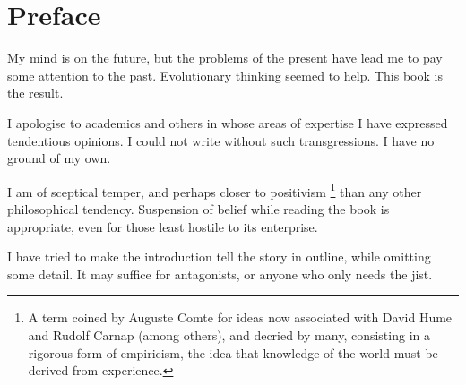 \chapter*{Preface}


My mind is on the future, but the problems of the present have lead me to pay some attention to the past.
Evolutionary thinking seemed to help.
This book is the result.

I apologise to academics and others in whose areas of expertise I have expressed tendentious opinions.
I could not write without such transgressions.
I have no ground of my own.

I am of sceptical temper, and perhaps closer to positivism%
\footnote{A term coined by Auguste Comte for ideas now associated with David Hume and Rudolf Carnap (among others), and decried by many, consisting in a rigorous form of empiricism, the idea that knowledge of the world must be derived from experience.}
than any other philosophical tendency.
Suspension of belief while reading the book is appropriate, even for those least hostile to its enterprise.

I have tried to make the introduction tell the story in outline, while omitting some detail.
It may suffice for antagonists, or anyone who only needs the jist.
